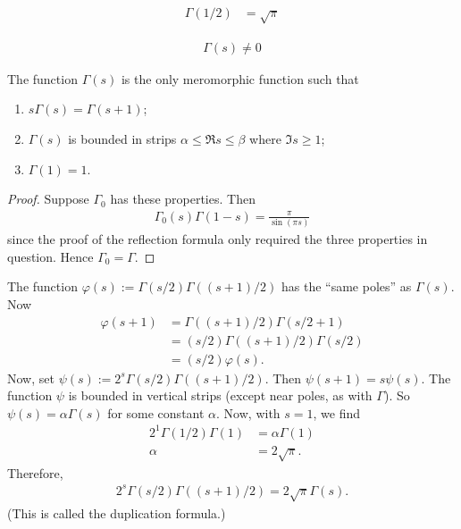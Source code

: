 \documentclass[11pt, oneside,margin=1in]{article}
\begin{document}
\begin{remark}
	\begin{align*}
		\Gamma(1/2) &= \sqrt{\pi}
	\end{align*}
\end{remark}
\begin{remark}
	\begin{align*}
		\Gamma(s)\ne 0
	\end{align*}
\end{remark}
\begin{proposition}[ ]\label{}\text{}
The function $\Gamma(s)$ is the only meromorphic function such that
\begin{enumerate}
	\item $s\Gamma(s) = \Gamma (s+1)$;
	\item $\Gamma(s)$ is bounded in strips $\alpha\le \Re s \le \beta$ where $\Im s \ge 1$;
	\item $\Gamma(1)=1$.
\end{enumerate}
\end{proposition}
\begin{proof}
Suppose $\Gamma_0$ has these properties. Then 
\begin{align*}
	\Gamma_0(s)\Gamma (1-s) = \frac{\pi}{\sin  (\pi s)}
\end{align*}
since the proof of the reflection formula only required the three properties in question. Hence $\Gamma_0 = \Gamma$. 
\end{proof}

The function $\varphi(s) :=\Gamma(s/2)\Gamma ((s+1) /2)$ has the ``same poles'' as $\Gamma(s)$. Now
\begin{align*}
	\varphi(s+1)& = \Gamma((s+1)/2) \Gamma(s/2 + 1)\\
		    &= (s/2)\Gamma ((s+1)/2) \Gamma(s/2)\\
		    &=  (s/2)\varphi (s).
\end{align*}
Now, set $\psi(s):=2^s\Gamma(s/2)\Gamma ((s+1) /2) $. Then $\psi(s+1)=s\psi (s)$. The function $\psi$ is bounded in vertical strips (except near poles, as with $\Gamma$). So $\psi(s) = \alpha\Gamma (s)$ for some constant $\alpha$. Now, with $s=1$, we find
\begin{align*}
	2^1 \Gamma(1/2)\Gamma (1) &= \alpha \Gamma (1)\\
	\alpha &= 2\sqrt{\pi}.
\end{align*}
Therefore,
\begin{align*}
	2^s\Gamma(s/2)\Gamma((s+1) /2) = 2\sqrt \pi \Gamma(s).
\end{align*}
(This is called the duplication formula.)
\end{document}
